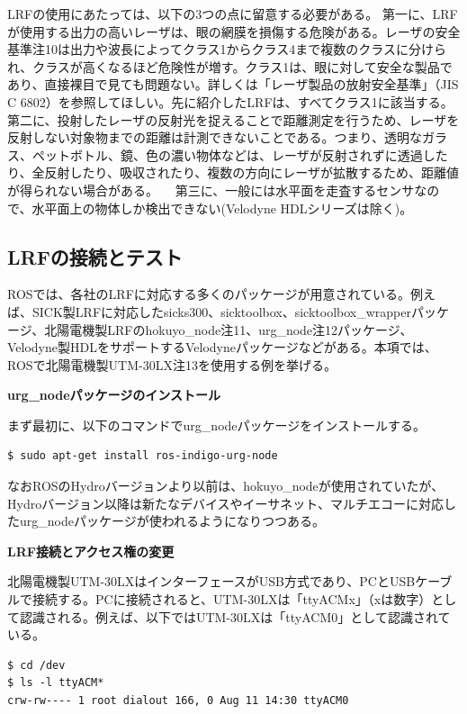 LRFの使用にあたっては、以下の3つの点に留意する必要がある。
第一に、LRFが使用する出力の高いレーザは、眼の網膜を損傷する危険がある。レーザの安全基準注10は出力や波長によってクラス1からクラス4まで複数のクラスに分けられ、クラスが高くなるほど危険性が増す。クラス1は、眼に対して安全な製品であり、直接裸目で見ても問題ない。詳しくは「レーザ製品の放射安全基準」（JIS C 6802）を参照してほしい。先に紹介したLRFは、すべてクラス1に該当する。
第二に、投射したレーザの反射光を捉えることで距離測定を行うため、レーザを反射しない対象物までの距離は計測できないことである。つまり、透明なガラス、ペットボトル、鏡、色の濃い物体などは、レーザが反射されずに透過したり、全反射したり、吸収されたり、複数の方向にレーザが拡散するため、距離値が得られない場合がある。
　第三に、一般には水平面を走査するセンサなので、水平面上の物体しか検出できない(Velodyne HDLシリーズは除く)。

\subsection{LRFの接続とテスト}

ROSでは、各社のLRFに対応する多くのパッケージが用意されている。例えば、SICK製LRFに対応したsicks300、sicktoolbox、sicktoolbox\_wrapperパッケージ、北陽電機製LRFのhokuyo_node注11、urg_node注12パッケージ、Velodyne製HDLをサポートするVelodyneパッケージなどがある。本項では、ROSで北陽電機製UTM-30LX注13を使用する例を挙げる。

\textbf{urg\_nodeパッケージのインストール}

まず最初に、以下のコマンドでurg\_nodeパッケージをインストールする。

\begin{lstlisting}[language=ROS]
$ sudo apt-get install ros-indigo-urg-node
\end{lstlisting}

なおROSのHydroバージョンより以前は、hokuyo\_nodeが使用されていたが、Hydroバージョン以降は新たなデバイスやイーサネット、マルチエコーに対応したurg\_nodeパッケージが使われるようになりつつある。

\textbf{LRF接続とアクセス権の変更}

北陽電機製UTM-30LXはインターフェースがUSB方式であり、PCとUSBケーブルで接続する。PCに接続されると、UTM-30LXは「ttyACMx」（xは数字）として認識される。例えば、以下ではUTM-30LXは「ttyACM0」として認識されている。

\begin{lstlisting}[language=ROS]
$ cd /dev
$ ls -l ttyACM*
crw-rw---- 1 root dialout 166, 0 Aug 11 14:30 ttyACM0
\end{lstlisting}

